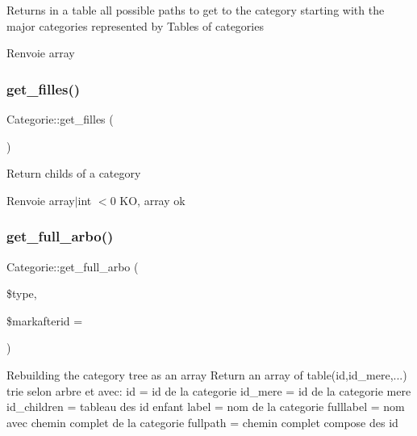 Returns in a table all possible paths to get to the category starting with the major categories represented by Tables of categories

\begin{DoxyReturn}{Renvoie}
array 
\end{DoxyReturn}
\mbox{\label{classCategorie_a71de352171d73a9c94582aba5f28f00c}} 
\subsubsection{\texorpdfstring{get\+\_\+filles()}{get\_filles()}}
{\footnotesize\ttfamily Categorie\+::get\+\_\+filles (\begin{DoxyParamCaption}{ }\end{DoxyParamCaption})}

Return childs of a category

\begin{DoxyReturn}{Renvoie}
array$\vert$int $<$0 KO, array ok 
\end{DoxyReturn}
\mbox{\label{classCategorie_ae3c0589c189107827addce4f99281f07}} 
\subsubsection{\texorpdfstring{get\+\_\+full\+\_\+arbo()}{get\_full\_arbo()}}
{\footnotesize\ttfamily Categorie\+::get\+\_\+full\+\_\+arbo (\begin{DoxyParamCaption}\item[{}]{\$type,  }\item[{}]{\$markafterid = {} }\end{DoxyParamCaption})}

Rebuilding the category tree as an array Return an array of table(\textquotesingle{}id\textquotesingle{},\textquotesingle{}id\+\_\+mere\textquotesingle{},...) trie selon arbre et avec\+: id = id de la categorie id\+\_\+mere = id de la categorie mere id\+\_\+children = tableau des id enfant label = nom de la categorie fulllabel = nom avec chemin complet de la categorie fullpath = chemin complet compose des id


